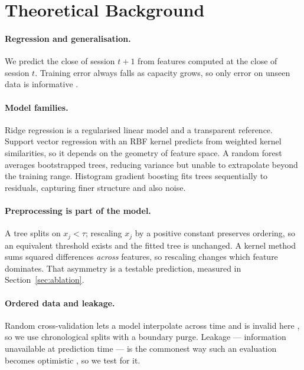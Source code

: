 \section{Theoretical Background}
\label{sec:background}

\paragraph{Regression and generalisation.}
We predict the close of session $t+1$ from features computed at the close of
session $t$. Training error always falls as capacity grows, so only error on
unseen data is informative \citep{hastie2009elements}.

\paragraph{Model families.}
Ridge regression is a regularised linear model and a transparent reference.
Support vector regression with an RBF kernel \citep{drucker1997support} predicts
from weighted kernel similarities, so it depends on the geometry of feature
space. A random forest \citep{breiman2001random} averages bootstrapped trees,
reducing variance but unable to extrapolate beyond the training range. Histogram
gradient boosting \citep{friedman2001gradient} fits trees sequentially to
residuals, capturing finer structure and also noise.

\paragraph{Preprocessing is part of the model.}
A tree splits on $x_j < \tau$; rescaling $x_j$ by a positive constant preserves
ordering, so an equivalent threshold exists and the fitted tree is unchanged. A
kernel method sums squared differences \emph{across} features, so rescaling changes
which feature dominates. That asymmetry is a testable prediction, measured in
Section~\ref{sec:ablation}.

\paragraph{Ordered data and leakage.}
Random cross-validation lets a model interpolate across time and is invalid here
\citep{bergmeir2018note,roberts2017crossvalidation}, so we use chronological splits
with a boundary purge. Leakage --- information unavailable at prediction time ---
is the commonest way such an evaluation becomes optimistic
\citep{kaufman2012leakage}, so we test for it.
